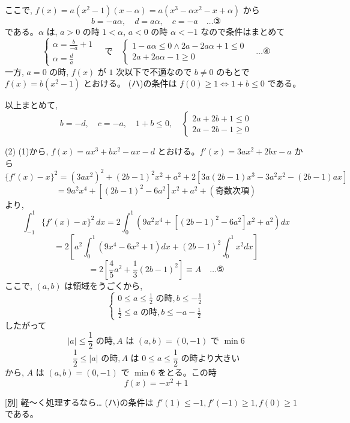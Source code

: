 \documentclass[../main.tex]{subfiles}
\begin{document}
ここで, $f(x) = a(x^2-1)(x-\alpha) = a(x^3 - \alpha x^2 - x + \alpha)$ から
\[
b = -a\alpha, \quad d = a\alpha, \quad c = -a \quad \dots \text{③}
\]
である。$\alpha$ は, $a>0$ の時 $1 < \alpha$, $a<0$ の時 $\alpha < -1$ なので条件はまとめて
\[
\begin{cases}
\alpha = \frac{b}{-a} + 1 \\
\alpha = \frac{d}{a}
\end{cases} \quad \text{で} \quad
\begin{cases}
1 - a\alpha \le 0 \land 2a - 2a\alpha + 1 \le 0 \\
2a + 2a\alpha - 1 \ge 0
\end{cases} \quad \dots \text{④}
\]
一方, $a=0$ の時, $f(x)$ が $1$ 次以下で不適なので $b \neq 0$ のもとで $f(x) = b(x^2-1)$ とおける。
(ハ)の条件は $f(0) \ge 1 \iff 1+b \le 0$ である。

以上まとめて,
\[
b = -d, \quad c = -a, \quad 1 + b \le 0, \quad
\begin{cases}
2a + 2b + 1 \le 0 \\
2a - 2b - 1 \ge 0
\end{cases}
\]

(2) (1)から, $f(x) = ax^3 + bx^2 - ax - d$ とおける。$f'(x) = 3ax^2 + 2bx - a$ から
\[
\{f'(x) - x\}^2 = (3ax^2)^2 + (2b-1)^2 x^2 + a^2 + 2 \left[ 3a(2b-1) x^3 - 3a^2 x^2 - (2b-1)ax \right]
\]
\[
= 9a^2 x^4 + \left[ (2b-1)^2 - 6a^2 \right] x^2 + a^2 + (\text{奇数次項})
\]
より,
\[
\int_{-1}^1 \{f'(x) - x\}^2 \, dx = 2 \int_0^1 \left( 9a^2 x^4 + \left[ (2b-1)^2 - 6a^2 \right] x^2 + a^2 \right) dx
\]
\[
= 2 \left[ a^2 \int_0^1 (9x^4 - 6x^2 + 1) dx + (2b-1)^2 \int_0^1 x^2 dx \right]
\]
\[
= 2 \left[ \frac{4}{5} a^2 + \frac{1}{3}(2b-1)^2 \right] \equiv A \quad \dots \text{⑤}
\]
ここで, $(a, b)$ は領域をうごくから,
\[
\begin{cases}
0 \le a \le \frac{1}{2} \text{ の時}, b \le -\frac{1}{2} \\
\frac{1}{2} \le a \text{ の時}, b \le -a - \frac{1}{2}
\end{cases}
\]
したがって
\[
|a| \le \frac{1}{2} \text{ の時}, A \text{ は } (a, b) = (0, -1) \text{ で } \min 6
\]
\[
\frac{1}{2} \le |a| \text{ の時}, A \text{ は } 0 \le a \le \frac{1}{2} \text{ の時より大きい}
\]
から, $A$ は $(a, b) = (0, -1)$ で $\min 6$ をとる。この時
\[
f(x) = -x^2 + 1
\]

[別] 軽〜く処理するなら…
(ハ)の条件は $f'(1) \le -1, f'(-1) \ge 1, f(0) \ge 1$ である。
\end{document}
